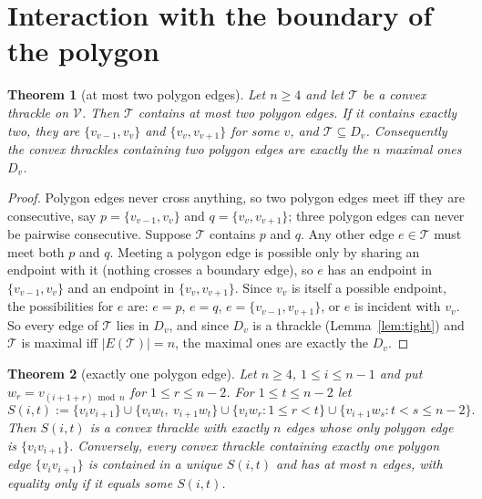 \documentclass[11pt,a4paper]{article}
\newtheorem{theorem}{Theorem}[section]
\theoremstyle{definition}
\theoremstyle{plain}
\newcommand{\V}{\mathcal{V}}
\newcommand{\Thr}{\mathcal{T}}
\begin{document}
\section{Interaction with the boundary of the polygon}

\begin{theorem}[at most two polygon edges]\label{thm:two}
Let $n\ge4$ and let $\Thr$ be a convex thrackle on $\V$.  Then $\Thr$ contains at
most two polygon edges.  If it contains exactly two, they are
$\{v_{v-1},v_v\}$ and $\{v_v,v_{v+1}\}$ for some $v$, and $\Thr\subseteq D_v$.
Consequently the convex thrackles containing two polygon edges are exactly the
$n$ maximal ones $D_v$.
\end{theorem}

\begin{proof}
Polygon edges never cross anything, so two polygon edges meet iff they are
consecutive, say $p=\{v_{v-1},v_v\}$ and $q=\{v_v,v_{v+1}\}$; three polygon
edges can never be pairwise consecutive.  Suppose $\Thr$ contains $p$ and $q$.
Any other edge $e\in\Thr$ must meet both $p$ and $q$.  Meeting a polygon edge is
possible only by sharing an endpoint with it (nothing crosses a boundary edge),
so $e$ has an endpoint in $\{v_{v-1},v_v\}$ and an endpoint in
$\{v_v,v_{v+1}\}$.  Since $v_v$ is itself a possible endpoint, the possibilities
for $e$ are: $e=p$, $e=q$, $e=\{v_{v-1},v_{v+1}\}$, or $e$ is incident with
$v_v$.
So every edge of $\Thr$ lies in $D_v$, and since $D_v$ is a thrackle
(Lemma~\ref{lem:tight}) and $\Thr$ is maximal iff $|E(\Thr)|=n$, the maximal ones
are exactly the $D_v$.
\end{proof}

\begin{theorem}[exactly one polygon edge]\label{thm:one}
Let $n\ge4$, $1\le i\le n-1$ and put $w_r=v_{(i+1+r)\bmod n}$ for
$1\le r\le n-2$.  For $1\le t\le n-2$ let
\[
S(i,t):=\{v_iv_{i+1}\}\cup\{v_iw_t,\ v_{i+1}w_t\}
 \cup\{v_iw_r:1\le r<t\}\cup\{v_{i+1}w_s:t<s\le n-2\}.
\]
Then $S(i,t)$ is a convex thrackle with exactly $n$ edges whose only polygon
edge is $\{v_iv_{i+1}\}$.  Conversely, every convex thrackle containing exactly
one polygon edge $\{v_iv_{i+1}\}$ is contained in a unique $S(i,t)$ and has at
most $n$ edges, with equality only if it equals some $S(i,t)$.
\end{theorem}
\end{document}
